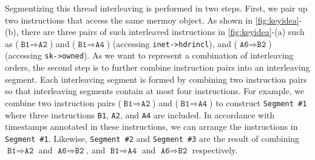 Segmentizing this thread interleaving is performed in two steps.
%
First, we pair up two instructions that access the same mermoy object.
%
As shown in \autoref{fig:keyidea}-(b), there are three pairs of such
interleaved instructions in \autoref{fig:keyidea}-(a) such as
($\texttt{B1} \Rightarrow \texttt{A2}$) and
($\texttt{B1} \Rightarrow \texttt{A4}$) (accessing
\texttt{inet->hdrincl}), and ($\texttt{A6} \Rightarrow \texttt{B2}$)
(accessing \texttt{sk->owned}).
%
As we want to represent a combination of interleaving orders, the
second step is to further combine instruction pairs into an
interleaving segment.
%
Each interleaving segment is formed by combining two instruction pairs
so that interleaving segments contain at most four instructions.
%
For example, we combine two instruction pairs
($\texttt{B1} \Rightarrow \texttt{A2}$) and
($\texttt{B1} \Rightarrow \texttt{A4}$) to construct \texttt{Segment
  \#1} where three instructions \texttt{B1}, \texttt{A2}, and
\texttt{A4} are included.
%
In accordance with timestamps annotated in these instructions, we can
arrange the instructions in \texttt{Segment \#1}.
%
Likewise, \texttt{Segment \#2} and \texttt{Segment \#3} are the result
of combining $\texttt{B1} \Rightarrow \texttt{A2}$ and
$\texttt{A6} \Rightarrow \texttt{B2}$, and
$\texttt{B1} \Rightarrow \texttt{A4}$ and
$\texttt{A6} \Rightarrow \texttt{B2}$ respectively.

%
%



